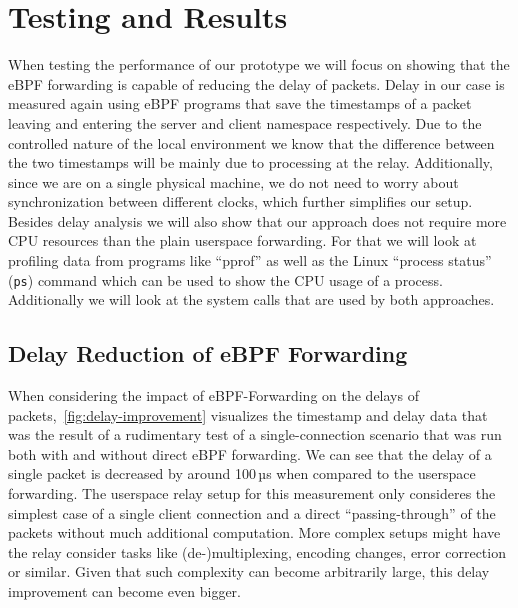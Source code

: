 \section{Testing and Results}\label{sec:testing_and_results}
When testing the performance of our prototype we will focus on showing that the eBPF forwarding
is capable of reducing the delay of packets.
Delay in our case is measured again using eBPF programs that save the timestamps of a packet 
leaving and entering the server and client namespace respectively.
Due to the controlled nature of the local environment we know that the difference 
between the two timestamps will be mainly due to processing at the relay.
Additionally, since we are on a single physical machine, we do not need to worry about
synchronization between different clocks, which further simplifies our setup.
Besides delay analysis we will also show that our approach does not require more CPU resources
than the plain userspace forwarding.
For that we will look at profiling data from programs like ``pprof'' %
as well as the Linux ``process status'' (\verb|ps|) command which can be used to 
show the CPU usage of a process. %
Additionally we will look at the system calls that are used by both approaches.

\subsection{Delay Reduction of eBPF Forwarding}
When considering the impact of eBPF-Forwarding on the delays of packets,~\autoref{fig:delay-improvement}
visualizes the timestamp and delay data that was the result of a rudimentary test of a single-connection 
scenario that was run both with and without direct eBPF forwarding.
We can see that the delay of a single packet is decreased by around 100\,µs
when compared to the userspace forwarding. 
The userspace relay setup for this measurement only consideres the simplest case of a single client connection 
and a direct ``passing-through'' of the packets without much additional computation.
More complex setups might have the relay consider tasks like (de-)multiplexing, 
encoding changes, error correction or similar. 
Given that such complexity can become arbitrarily large, this delay improvement can become even bigger.


